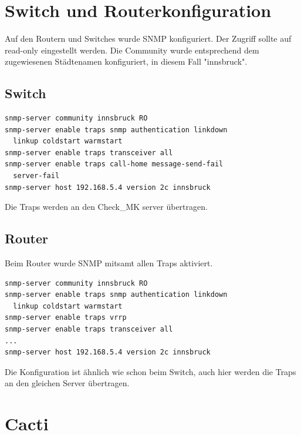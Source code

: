 \chapter{Switch und Routerkonfiguration}

Auf den Routern und Switches wurde \ac{SNMP} konfiguriert. Der Zugriff sollte auf read-only eingestellt werden. Die Community wurde entsprechend dem zugewiesenen Städtenamen konfiguriert, in diesem Fall "innsbruck".

\section{Switch}

\begin{lstlisting}[caption={SNMP-Config Switch},label={lst:switch},language={}]
snmp-server community innsbruck RO
snmp-server enable traps snmp authentication linkdown 
  linkup coldstart warmstart
snmp-server enable traps transceiver all
snmp-server enable traps call-home message-send-fail 
  server-fail
snmp-server host 192.168.5.4 version 2c innsbruck
\end{lstlisting}

Die Traps werden an den Check\_MK server übertragen.


\section{Router}

Beim Router wurde \ac{SNMP} mitsamt allen Traps aktiviert.

\begin{lstlisting}[caption={SNMP-Config Router},label={lst:router},language={}]
snmp-server community innsbruck RO
snmp-server enable traps snmp authentication linkdown 
  linkup coldstart warmstart
snmp-server enable traps vrrp
snmp-server enable traps transceiver all
...
snmp-server host 192.168.5.4 version 2c innsbruck
\end{lstlisting}

Die Konfiguration ist ähnlich wie schon beim Switch, auch hier werden die Traps an den gleichen Server übertragen.



\chapter{Cacti}
\label{cacti}

